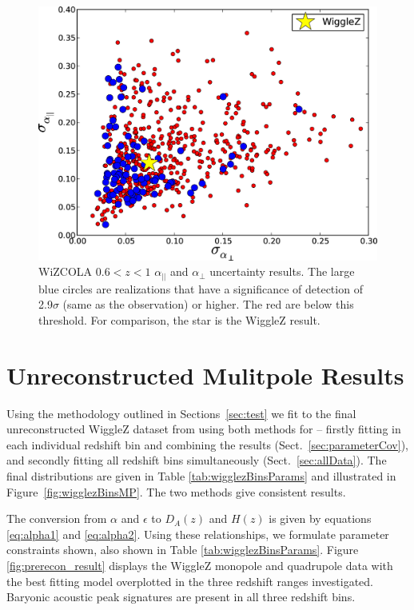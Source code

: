 \documentclass[iop,twocolappendix]{emulateapj}
\begin{document}
\begin{figure}
\begin{center}
\includegraphics[width=0.7\columnwidth]{figures/WiZCOLA_unc_z0pt6_1pt0/WiZCOLA_unc_z0pt6_1pt0}
\caption{\label{fig:wizcola_hdaUnc_z60_epsilonT15} WiZCOLA $0.6<z<1$ $\alpha_{||}$ and $\alpha_\perp$ uncertainty results. The large blue circles are realizations that have a significance of detection of 2.9$\sigma$ (same as the observation) or higher. The red are below this threshold. For comparison, the star is the WiggleZ result.%
}
\end{center}
\end{figure}






\section{Unreconstructed Mulitpole Results}
\label{sec:multi}

Using the methodology outlined in Sections~\ref{sec:test} we fit to the final unreconstructed WiggleZ dataset from \citet{KazinKoda2014} using both methods for -- firstly fitting in each individual redshift bin and combining the results (Sect.~\ref{sec:parameterCov}), and secondly fitting all redshift bins simultaneously (Sect.~\ref{sec:allData}). The final distributions are given in Table \ref{tab:wigglezBinsParams} and illustrated in Figure~\ref{fig:wigglezBinsMP}.  The two methods give consistent results. 


The conversion from $\alpha$ and $\epsilon$ to $D_A(z)$ and $H(z) $ is given by equations \eqref{eq:alpha1} and \eqref{eq:alpha2}. Using these relationships, we formulate parameter constraints shown, also shown in Table \ref{tab:wigglezBinsParams}. Figure \ref{fig:prerecon_result} displays the WiggleZ monopole and quadrupole data with the best fitting model overplotted in the three redshift ranges investigated. Baryonic acoustic peak signatures are present in all three redshift bins.
\end{document}
